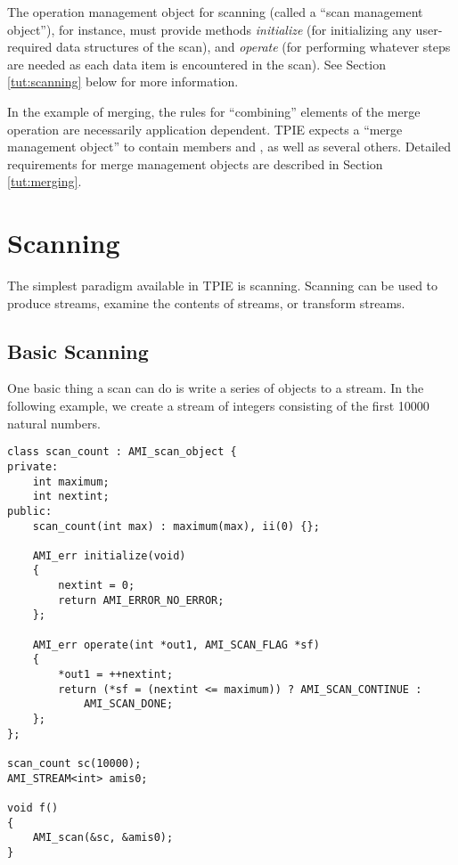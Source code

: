 The operation management object for scanning (called a
``scan management object''), for instance, must provide methods {\em
   initialize} (for initializing any user-required data
structures of the scan), and {\em operate} (for performing
whatever steps are needed as each data item is encountered
in the scan). See Section \ref{tut:scanning} below for more
information.

In the example of merging, the rules for ``combining''
elements of the merge operation are necessarily application
dependent. TPIE expects a ``merge management
object'' to contain
members  and , as well as
several others. Detailed requirements for merge management
objects are described in Section \ref{tut:merging}.

\section{Scanning}

 
The simplest paradigm available in TPIE is scanning.  Scanning can be
used to produce streams, examine the contents of streams, or transform
streams.  

\subsection{Basic Scanning}

One basic thing a scan can do is write a series of
objects to a stream.  In the following example, we create a
stream of integers consisting of the first 10000 natural
numbers.  

\begin{verbatim}
class scan_count : AMI_scan_object {
private:
    int maximum;
    int nextint;
public:
    scan_count(int max) : maximum(max), ii(0) {};

    AMI_err initialize(void) 
    {
        nextint = 0;
        return AMI_ERROR_NO_ERROR;
    };

    AMI_err operate(int *out1, AMI_SCAN_FLAG *sf)
    {
        *out1 = ++nextint;
        return (*sf = (nextint <= maximum)) ? AMI_SCAN_CONTINUE : 
            AMI_SCAN_DONE;
    };
};

scan_count sc(10000);
AMI_STREAM<int> amis0;    

void f()
{
    AMI_scan(&sc, &amis0);
}
\end{verbatim}

